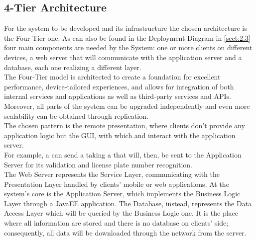 \documentclass[../../../DD.tex]{subfiles}
\begin{document}
	
	\subsection{4-Tier Architecture\label{subsect:2.6.1}}
	For the system to be developed and its infrastructure the chosen architecture is the Four-Tier one. As can also be found in the Deployment Diagram in \ref{sect:2.3} four main components are needed by the System: one or more clients on different devices, a web server that will communicate with the application server and a database, each one realizing a different layer. \\
	The Four‑Tier model is architected to create a foundation for excellent performance, device‑tailored experiences, and allows for integration of both internal services and applications as well as third‑party services and APIs. Moreover, all parts of the system can be upgraded independently and even more scalability can be obtained through replication. \\
	
	The chosen pattern is the remote presentation, where clients don't provide any application logic but the GUI, with which  and  interact with the application server. \\
	For example, a  can send a  taking a  that will, then, be sent to the Application Server for its validation and license plate number recognition. \\
	
	The Web Server represents the Service Layer, communicating with the Presentation Layer handled by clients' mobile or web applications. At the system's core is the Application Server, which implements the Business Logic Layer through a JavaEE application. The Database, instead, represents the Data Access Layer which will be queried by the Business Logic one. It is the place where all information are stored and there is no database on clients' side; consequently, all data will be downloaded through the network from the server.
	
\end{document}
